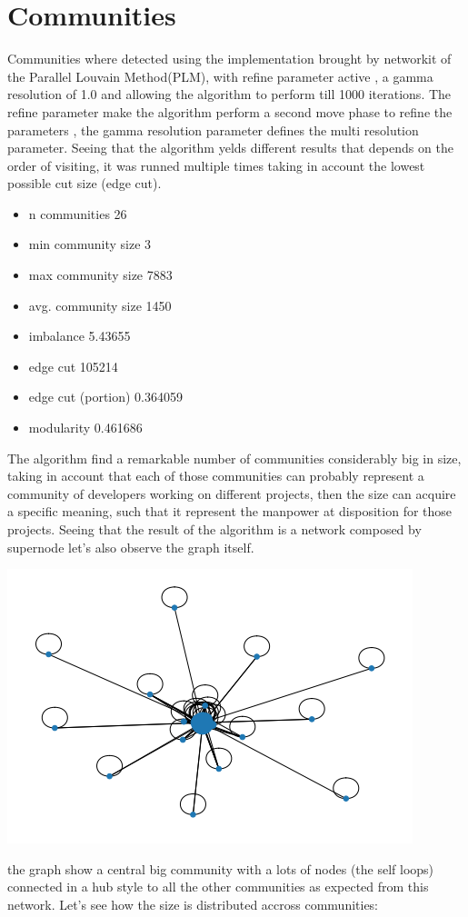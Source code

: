 \documentclass[]{article}
\begin{document}
    \section*{Communities} 
    Communities where detected using the implementation brought by networkit of the Parallel Louvain Method(PLM), with refine parameter active , a gamma resolution of 1.0 and allowing the algorithm to perform till 1000 iterations. The refine parameter make the algorithm perform a second move phase to refine the parameters , the gamma resolution parameter defines the multi resolution parameter. Seeing that the algorithm yelds different results that depends on the order of visiting, it was runned multiple times taking in account the lowest possible cut size (edge cut).
    \begin{itemize}
        \item n communities            26
        \item min community size        3
        \item max community size     7883
        \item avg. community size    1450
        \item imbalance              5.43655
        \item edge cut             105214
        \item edge cut (portion)        0.364059
        \item modularity                0.461686
    \end{itemize}
    The algorithm find a remarkable number of communities considerably big in size, taking in account that each of those communities can probably represent a community of developers working on different projects, then the size can acquire a specific meaning, such that it represent the manpower at disposition for those projects. 
    Seeing that the result of the algorithm is a network composed by supernode let's also observe the graph itself.
    \begin{center}
        \includegraphics[scale=0.5]{charts/louvain.png}
    \end{center}
    the graph show a central big community with a lots of nodes (the self loops) connected in a hub style to all the other communities as expected from this network. Let's see how the size is distributed accross communities:
\end{document}
